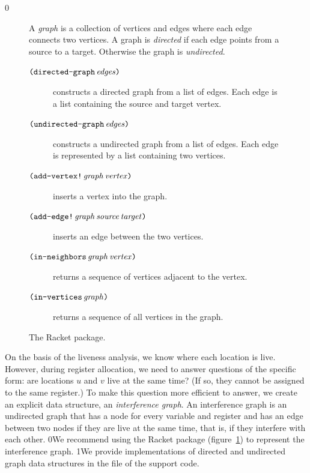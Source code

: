 \documentclass[7x10]{TimesAPriori_MIT}%
\def\racketEd{0}
\def\pythonEd{1}
\def\edition{1}
\newcommand{\racket}[1]{{\if\edition\racketEd{#1}\fi}}
\newcommand{\pythonColor}[0]{}
\newcommand{\python}[1]{{\if\edition\pythonEd\pythonColor #1\fi}}
\numberwithin{theorem}{chapter}
\numberwithin{definition}{chapter}
\numberwithin{equation}{chapter}
\begin{document}
{\if\edition\racketEd
\begin{figure}[tp]
  \small
  \begin{tcolorbox}[title=\href{https://docs.racket-lang.org/graph/index.html}{The Racket Graph Library}]
    A \emph{graph} is a collection of vertices and edges where each
    edge connects two vertices.  A graph is \emph{directed} if each
    edge points from a source to a target.  Otherwise the graph is
    \emph{undirected}.
  \begin{description}
  \item[$\texttt{(}\texttt{directed-graph}\,\mathit{edges}\texttt{)}$] constructs a
    directed graph from a list of edges. Each edge is a list
    containing the source and target vertex.
  \item[$\texttt{(}\texttt{undirected-graph}\,\mathit{edges}\texttt{)}$] constructs a
    undirected graph from a list of edges. Each edge is represented by
    a list containing two vertices.
  \item[$\texttt{(}\texttt{add-vertex!}\,\mathit{graph}\,\mathit{vertex}\texttt{)}$]
    inserts a vertex into the graph.
  \item[$\texttt{(}\texttt{add-edge!}\,\mathit{graph}\,\mathit{source}\,\mathit{target}\texttt{)}$]
    inserts an edge between the two vertices.
  \item[$\texttt{(}\texttt{in-neighbors}\,\mathit{graph}\,\mathit{vertex}\texttt{)}$]
    returns a sequence of vertices adjacent to the vertex.
  \item[$\texttt{(}\texttt{in-vertices}\,\mathit{graph}\texttt{)}$]
    returns a sequence of all vertices in the graph.
  \end{description}
\end{tcolorbox}
  \caption{The Racket  package.}
  \label{fig:graph}
\end{figure}
\fi}

On the basis of the liveness analysis, we know where each location is
live.  However, during register allocation, we need to answer
questions of the specific form: are locations $u$ and $v$ live at the
same time?  (If so, they cannot be assigned to the same register.)  To
make this question more efficient to answer, we create an explicit
data structure, an \emph{interference
  graph}.  An interference graph is
an undirected graph that has a node for every variable and register
and has an edge between two nodes if they are
live at the same time, that is, if they interfere with each other.
%
\racket{We recommend using the Racket  package
  (figure~\ref{fig:graph}) to represent the interference graph.}
%
\python{We provide implementations of directed and undirected graph
  data structures in the file \code{graph.py} of the support code.}
\end{document}
